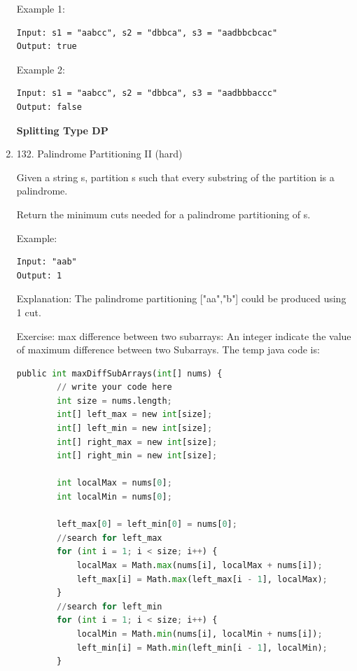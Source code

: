 \documentclass[../main.tex]{subfiles}
\begin{document}
\begin{enumerate}
Example 1:
\begin{lstlisting}
Input: s1 = "aabcc", s2 = "dbbca", s3 = "aadbbcbcac"
Output: true
\end{lstlisting}

Example 2:
\begin{lstlisting}
Input: s1 = "aabcc", s2 = "dbbca", s3 = "aadbbbaccc"
Output: false
\end{lstlisting}





\textbf{Splitting Type DP}
\item 132. Palindrome Partitioning II (hard)

Given a string s, partition s such that every substring of the partition is a palindrome.

Return the minimum cuts needed for a palindrome partitioning of s.

Example:
\begin{lstlisting}
Input: "aab"
Output: 1
\end{lstlisting}

Explanation: The palindrome partitioning ["aa","b"] could be produced using 1 cut.

Exercise: max difference between two subarrays: An integer indicate the value of maximum difference between two Subarrays. The temp java code is:
\begin{lstlisting}[language = Python]
public int maxDiffSubArrays(int[] nums) {
        // write your code here
        int size = nums.length;
        int[] left_max = new int[size];
        int[] left_min = new int[size];
        int[] right_max = new int[size];
        int[] right_min = new int[size];
        
        int localMax = nums[0];
        int localMin = nums[0];
        
        left_max[0] = left_min[0] = nums[0];
        //search for left_max
        for (int i = 1; i < size; i++) {
            localMax = Math.max(nums[i], localMax + nums[i]);
            left_max[i] = Math.max(left_max[i - 1], localMax);
        }
        //search for left_min
        for (int i = 1; i < size; i++) {
            localMin = Math.min(nums[i], localMin + nums[i]);
            left_min[i] = Math.min(left_min[i - 1], localMin);
        }
        

\end{lstlisting}
\end{enumerate}
\end{document}

